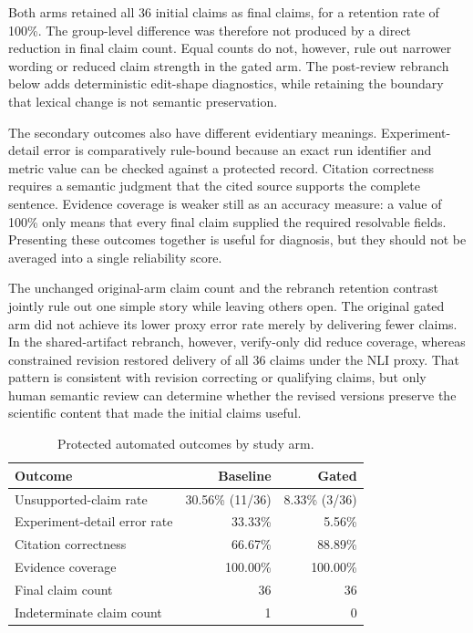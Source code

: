 \documentclass[11pt]{article}
\begin{document}
Both arms retained all 36 initial claims as final claims, for a retention rate of 100\%. The group-level difference was therefore not produced by a direct reduction in final claim count. Equal counts do not, however, rule out narrower wording or reduced claim strength in the gated arm. The post-review rebranch below adds deterministic edit-shape diagnostics, while retaining the boundary that lexical change is not semantic preservation.

The secondary outcomes also have different evidentiary meanings. Experiment-detail error is comparatively rule-bound because an exact run identifier and metric value can be checked against a protected record. Citation correctness requires a semantic judgment that the cited source supports the complete sentence. Evidence coverage is weaker still as an accuracy measure: a value of 100\% only means that every final claim supplied the required resolvable fields. Presenting these outcomes together is useful for diagnosis, but they should not be averaged into a single reliability score.

The unchanged original-arm claim count and the rebranch retention contrast jointly rule out one simple story while leaving others open. The original gated arm did not achieve its lower proxy error rate merely by delivering fewer claims. In the shared-artifact rebranch, however, verify-only did reduce coverage, whereas constrained revision restored delivery of all 36 claims under the NLI proxy. That pattern is consistent with revision correcting or qualifying claims, but only human semantic review can determine whether the revised versions preserve the scientific content that made the initial claims useful.

\begin{table}[H]
\centering
\caption{Protected automated outcomes by study arm.}
\label{tab:protected}
\begin{tabularx}{0.88\textwidth}{>{\raggedright\arraybackslash}X r r}
\toprule
Outcome & Baseline & Gated \\
\midrule
Unsupported-claim rate & 30.56\% (11/36) & 8.33\% (3/36) \\
Experiment-detail error rate & 33.33\% & 5.56\% \\
Citation correctness & 66.67\% & 88.89\% \\
Evidence coverage & 100.00\% & 100.00\% \\
Final claim count & 36 & 36 \\
Indeterminate claim count & 1 & 0 \\
\bottomrule
\end{tabularx}
\end{table}
\end{document}
